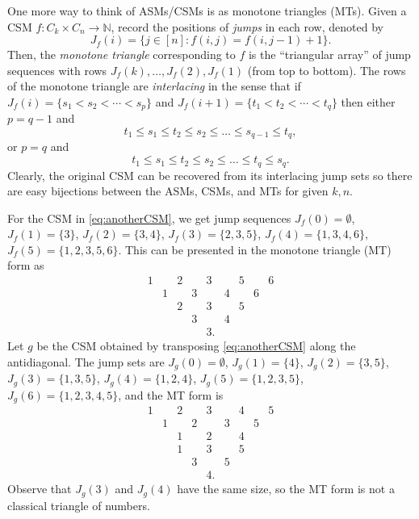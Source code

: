 \documentclass[12pt]{amsart}
\newcommand{\N}{{\mathbb N}}
\numberwithin{equation}{section}
\theoremstyle{definition}
\newcommand{\longto}{\longrightarrow}
\begin{document}
One more way to think of ASMs/CSMs is as monotone
triangles (MTs). Given a CSM $f \colon C_k \times C_n \longto \N$,
record the positions of \emph{jumps} in each row, denoted by
\begin{equation}\label{eq:jumps}
J_f(i) = \{j \in [n] \colon f(i,j) = f(i,j-1) + 1\}.
\end{equation}
Then, the \emph{monotone triangle} corresponding to $f$ is the
``triangular array'' of jump sequences with rows $J_{f}(k), \dotsc,
J_{f}(2), J_{f}(1)$ (from top to bottom).  The rows of the monotone triangle are
\emph{interlacing} in the sense that if $J_f(i)=\{s_{1}<s_{2}<\cdots <
s_{p} \}$ and $ J_f(i+1)= \{t_{1}<t_{2}<\cdots < t_{q}\}$ then either
$p= q - 1$ and
\begin{equation}\label{eq:interlacing.1}
t_1 \leq s_1 \leq t_2 \leq s_2 \leq \dots \leq s_{q-1}
\leq t_{q},
\end{equation}
or $p=q$ and
\begin{equation}\label{eq:interlacing.2}
t_1 \leq s_1 \leq t_2 \leq s_2 \leq \dots
\leq t_{q} \leq s_{q}.
\end{equation}
Clearly, the original CSM can be recovered
from its interlacing jump sets so there are easy bijections between
the ASMs, CSMs, and MTs for given $k,n$.

For the CSM in \eqref{eq:anotherCSM}, we get jump sequences $J_f(0) =
\emptyset$, $J_f(1) = \{3\}$, $J_f(2) = \{3,4\}$, $J_f(3) =
\{2,3,5\}$, $J_f(4) = \{1,3,4,6\}$, $J_f(5) = \{1,2,3,5,6\}$. This can
be presented in the monotone triangle
(MT) form as $$\begin{array}{ccccccccc} 1&&2&&3&&5&&6 \\ &1&&3&&4&&6& \\
&&2&&3&&5&& \\ &&&3&&4&&& \\ &&&&3.&&&& \end{array}
$$
Let $g$ be the CSM obtained by transposing \eqref{eq:anotherCSM} along the antidiagonal.
The jump sets are $J_g(0) = \emptyset$, $J_g(1) = \{4\}$, $J_g(2) =
\{3,5\}$, $J_g(3) = \{1,3,5\}$, $J_g(4) = \{1,2,4\}$, $J_g(5) =
\{1,2,3,5\}$, $J_g(6) = \{1,2,3,4,5\}$,
and the MT form
is $$\begin{array}{ccccccccc} 1&&2&&3&&4&&5 \\ &1&&2&&3&&5& \\
&&1&&2&&4&& \\ &&1&&3&&5&& \\ &&&3&&5&&& \\ &&&&4.&&&& \end{array}$$
Observe that $J_g(3)$ and $J_g(4)$ have the same size, so the MT form
is not a classical triangle of numbers.
\end{document}
